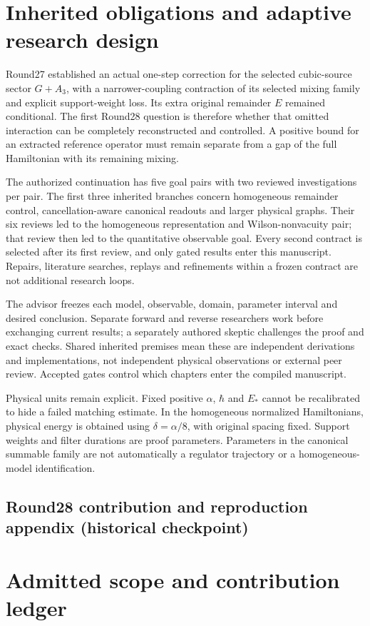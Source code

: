 \section{Inherited obligations and adaptive research design}
Round27 established an actual one-step correction for the selected cubic-source sector $G+A_3$, with a narrower-coupling contraction of its selected mixing family and explicit support-weight loss. Its extra original remainder $E$ remained conditional. The first Round28 question is therefore whether that omitted interaction can be completely reconstructed and controlled. A positive bound for an extracted reference operator must remain separate from a gap of the full Hamiltonian with its remaining mixing.

The authorized continuation has five goal pairs with two reviewed investigations per pair. The first three inherited branches concern homogeneous remainder control, cancellation-aware canonical readouts and larger physical graphs. Their six reviews led to the homogeneous representation and Wilson-nonvacuity pair; that review then led to the quantitative observable goal. Every second contract is selected after its first review, and only gated results enter this manuscript. Repairs, literature searches, replays and refinements within a frozen contract are not additional research loops.

The advisor freezes each model, observable, domain, parameter interval and desired conclusion. Separate forward and reverse researchers work before exchanging current results; a separately authored skeptic challenges the proof and exact checks. Shared inherited premises mean these are independent derivations and implementations, not independent physical observations or external peer review. Accepted gates control which chapters enter the compiled manuscript.

Physical units remain explicit. Fixed positive $\alpha$, $\hbar$ and $E_*$ cannot be recalibrated to hide a failed matching estimate. In the homogeneous normalized Hamiltonians, physical energy is obtained using $\delta=\alpha/8$, with original spacing fixed. Support weights and filter durations are proof parameters. Parameters in the canonical summable family are not automatically a regulator trajectory or a homogeneous-model identification.



\clearpage

\clearpage
\subsection*{Round28 contribution and reproduction appendix (historical checkpoint)}
\section{Admitted scope and contribution ledger}

\clearpage

\clearpage

